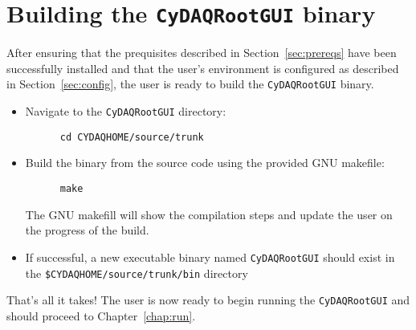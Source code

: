 \section{Building the \texttt{CyDAQRootGUI} binary}
After ensuring that the prequisites described in
Section~\ref{sec:prereqs} have been successfully installed and
that the user's environment is configured as described in
Section~\ref{sec:config}, the user is ready to build the
\texttt{CyDAQRootGUI} binary.
\begin{itemize}
\item{Navigate to the \texttt{CyDAQRootGUI} directory:
    \begin{lstlisting}
      cd CYDAQHOME/source/trunk
    \end{lstlisting}
  }
\item{Build the binary from the source code using the provided GNU
    makefile:
    \begin{lstlisting}
      make
    \end{lstlisting}
    The GNU makefill will show the compilation steps and update the
    user on the progress of the build.
  }
\item{If successful, a new executable binary named
    \texttt{CyDAQRootGUI} should exist in the
    \texttt{\$CYDAQHOME/source/trunk/bin} directory
  }
\end{itemize}
That's all it takes! The user is now ready to begin running the
\texttt{CyDAQRootGUI} and should proceed to Chapter~\ref{chap:run}.
